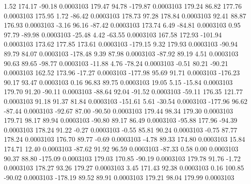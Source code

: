         1.52      174.17      -90.18     0.0003103
      179.47       94.78     -179.87     0.0003103
      179.24       86.82      177.76     0.0003103
      175.95        1.72      -86.42     0.0003103
      178.73       97.28      178.84     0.0003103
       92.41       88.87      176.93     0.0003103
       -3.16       96.16      -87.42     0.0003103
      173.74        6.49      -84.81     0.0003103
        0.95       97.79      -89.98     0.0003103
      -25.48        4.42      -63.55     0.0003103
      167.58      172.93     -101.94     0.0003103
      173.62      177.85      173.61     0.0003103
     -179.15        9.32      179.93     0.0003103
      -90.94       89.79       84.07     0.0003103
     -178.48        9.39       87.98     0.0003103
      -87.92       89.19        4.51     0.0003103
       90.63       89.65      -98.77     0.0003103
      -11.88        4.76      -78.24     0.0003103
       -0.51       80.21      -90.21     0.0003103
      162.52      173.96      -17.27     0.0003103
     -177.98       95.69       91.71     0.0003103
     -176.23       90.17       93.47     0.0003103
        0.16       96.83       89.75     0.0003103
       19.05        5.15      -15.84     0.0003103
      179.70       91.20      -90.11     0.0003103
      -88.64       92.04      -91.52     0.0003103
      -59.11      176.35      121.77     0.0003103
       91.18       91.37       81.84     0.0003103
     -151.61        5.61      -30.54     0.0003103
     -177.96       96.62      -87.44     0.0003103
      -92.67       87.00      -90.50     0.0003103
      179.44       98.34      179.30     0.0003103
      179.71       98.17       89.94     0.0003103
      -90.80       89.17       86.49     0.0003103
      -95.88      177.96      -94.39     0.0003103
      178.24       91.22       -0.27     0.0003103
       -0.55       85.81       90.24     0.0003103
       -0.75       87.77      178.24     0.0003103
      176.70       89.77       -0.69     0.0003103
       -4.78       89.33      174.80     0.0003103
       15.84      174.71       12.40     0.0003103
      -87.62       91.92       96.59     0.0003103
      -87.33        0.58        0.00     0.0003103
       90.37       88.80     -175.09     0.0003103
      179.03      170.85      -90.19     0.0003103
      179.78       91.76       -1.72     0.0003103
      178.27       93.26      179.27     0.0003103
        3.45      171.43       92.38     0.0003103
        0.16      100.85      -90.02     0.0003103
     -178.19       89.52       89.91     0.0003103
      179.21       98.04      179.99     0.0003103
